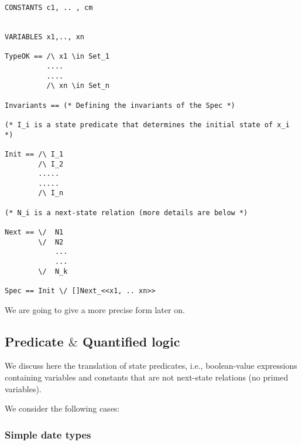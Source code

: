 \documentclass{article}
\theoremstyle{plain}
\numberwithin{equation}{section}
\begin{document}
\begin{lstlisting}[frame=single]
CONSTANTS c1, .. , cm


VARIABLES x1,.., xn

TypeOK == /\ x1 \in Set_1
          ....
          ....
          /\ xn \in Set_n

Invariants == (* Defining the invariants of the Spec *)           

(* I_i is a state predicate that determines the initial state of x_i *)

Init == /\ I_1    
        /\ I_2 
        .....
        .....
        /\ I_n 

(* N_i is a next-state relation (more details are below *)

Next == \/  N1 
        \/  N2 
            ...
            ...
        \/  N_k 

Spec == Init \/ []Next_<<x1, .. xn>>        
\end{lstlisting}

 We are going to  give a more precise form later on.


\subsection{Predicate $\&$ Quantified logic} \label{Sec:Pred-Quant}

We discuss here the translation of state predicates, i.e., boolean-value expressions containing variables and constants that are not  next-state relations (no primed variables).

We consider the following cases: 

\subsubsection{Simple date types} \label{SimType}
\end{document}
